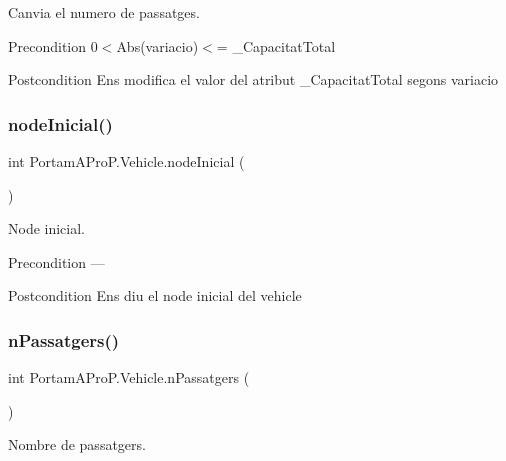 Canvia el numero de passatges. 

\begin{DoxyPrecond}{Precondition}
0$<$Abs(variacio)$<$= \+\_\+\+Capacitat\+Total 
\end{DoxyPrecond}
\begin{DoxyPostcond}{Postcondition}
Ens modifica el valor del atribut \+\_\+\+Capacitat\+Total segons variacio 
\end{DoxyPostcond}
\mbox{\label{class_portam_a_pro_p_1_1_vehicle_ac21f14eaa0e69f35b33dee20d085cb3e}} 
\subsubsection{\texorpdfstring{node\+Inicial()}{nodeInicial()}}
{\footnotesize\ttfamily int Portam\+A\+Pro\+P.\+Vehicle.\+node\+Inicial (\begin{DoxyParamCaption}{ }\end{DoxyParamCaption})}



Node inicial. 

\begin{DoxyPrecond}{Precondition}
--- 
\end{DoxyPrecond}
\begin{DoxyPostcond}{Postcondition}
Ens diu el node inicial del vehicle 
\end{DoxyPostcond}
\mbox{\label{class_portam_a_pro_p_1_1_vehicle_acaee99f30ba494ed5bde824f283ca329}} 
\subsubsection{\texorpdfstring{n\+Passatgers()}{nPassatgers()}}
{\footnotesize\ttfamily int Portam\+A\+Pro\+P.\+Vehicle.\+n\+Passatgers (\begin{DoxyParamCaption}{ }\end{DoxyParamCaption})}



Nombre de passatgers. 

